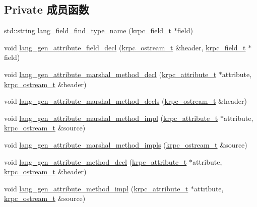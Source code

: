\subsection*{Private 成员函数}
\begin{DoxyCompactItemize}
\item 
std\+::string \hyperlink{classkrpc__gen__cpp__t_aa84e5f0e9005bdae14f6a8dd265cf614}{lang\+\_\+field\+\_\+find\+\_\+type\+\_\+name} (\hyperlink{classkrpc__field__t}{krpc\+\_\+field\+\_\+t} $\ast$field)
\item 
void \hyperlink{classkrpc__gen__cpp__t_ac92161d56b3a8bca8d9806d3eb8ee72b}{lang\+\_\+gen\+\_\+attribute\+\_\+field\+\_\+decl} (\hyperlink{classkrpc__ostream__t}{krpc\+\_\+ostream\+\_\+t} \&header, \hyperlink{classkrpc__field__t}{krpc\+\_\+field\+\_\+t} $\ast$field)
\item 
void \hyperlink{classkrpc__gen__cpp__t_a84fb67ab7f2eaa83cba2b465938ddf99}{lang\+\_\+gen\+\_\+attribute\+\_\+marshal\+\_\+method\+\_\+decl} (\hyperlink{classkrpc__attribute__t}{krpc\+\_\+attribute\+\_\+t} $\ast$attribute, \hyperlink{classkrpc__ostream__t}{krpc\+\_\+ostream\+\_\+t} \&header)
\item 
void \hyperlink{classkrpc__gen__cpp__t_ad3afc0cb1653b4d954cfc17213da2580}{lang\+\_\+gen\+\_\+attribute\+\_\+marshal\+\_\+method\+\_\+decls} (\hyperlink{classkrpc__ostream__t}{krpc\+\_\+ostream\+\_\+t} \&header)
\item 
void \hyperlink{classkrpc__gen__cpp__t_abc6d75384ba9d82bffed866da154aadc}{lang\+\_\+gen\+\_\+attribute\+\_\+marshal\+\_\+method\+\_\+impl} (\hyperlink{classkrpc__attribute__t}{krpc\+\_\+attribute\+\_\+t} $\ast$attribute, \hyperlink{classkrpc__ostream__t}{krpc\+\_\+ostream\+\_\+t} \&source)
\item 
void \hyperlink{classkrpc__gen__cpp__t_a77fbc582426c70f1a0c28d554bc38082}{lang\+\_\+gen\+\_\+attribute\+\_\+marshal\+\_\+method\+\_\+impls} (\hyperlink{classkrpc__ostream__t}{krpc\+\_\+ostream\+\_\+t} \&source)
\item 
void \hyperlink{classkrpc__gen__cpp__t_a663d7853ed50d573b60c6779cc133af8}{lang\+\_\+gen\+\_\+attribute\+\_\+method\+\_\+decl} (\hyperlink{classkrpc__attribute__t}{krpc\+\_\+attribute\+\_\+t} $\ast$attribute, \hyperlink{classkrpc__ostream__t}{krpc\+\_\+ostream\+\_\+t} \&header)
\item 
void \hyperlink{classkrpc__gen__cpp__t_ad3495ab5e7b3a99e1343a929d20d19ec}{lang\+\_\+gen\+\_\+attribute\+\_\+method\+\_\+impl} (\hyperlink{classkrpc__attribute__t}{krpc\+\_\+attribute\+\_\+t} $\ast$attribute, \hyperlink{classkrpc__ostream__t}{krpc\+\_\+ostream\+\_\+t} \&source)

\end{DoxyCompactItemize}
